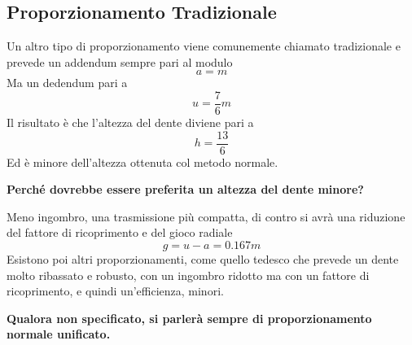 \documentclass[a4paper, 15pt]{article}
\begin{document}
\subsection{Proporzionamento Tradizionale}
\begin{adjustwidth}{2in}{}			
		Un altro tipo di proporzionamento viene comunemente chiamato tradizionale e prevede un addendum sempre pari al modulo \[a=m\]  Ma un dedendum pari a \[u = \dfrac{7}{6}m\] Il risultato è che l'altezza del dente diviene pari a \[h = \dfrac{13}{6}\] Ed è minore dell'altezza ottenuta col metodo normale. \newline
		
		\textbf{Perché dovrebbe essere preferita un altezza del dente minore?} 
		
		Meno ingombro, una trasmissione più compatta, di contro si avrà una riduzione del fattore di ricoprimento e del gioco radiale
		\[g = u-a = 0.167m\]		
		Esistono poi altri proporzionamenti, come quello tedesco che prevede un dente molto ribassato e robusto, con un ingombro ridotto ma con un fattore di ricoprimento, e quindi un'efficienza, minori. \newline
		 
\begin{center}
	\textbf{Qualora non specificato, si parlerà sempre di proporzionamento normale unificato.} \newline
\end{center}
\end{adjustwidth}
\end{document}
